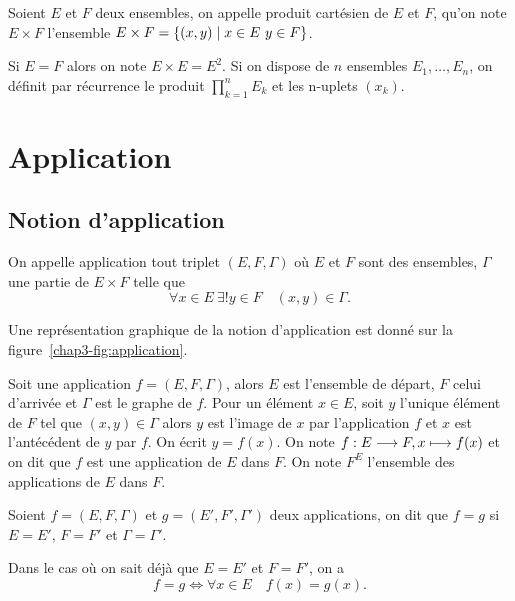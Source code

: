 \begin{defdef}
    Soient \(E\) et \(F\) deux ensembles, on appelle produit cartésien de \(E\) et 
    \(F\), qu'on note \(E \times F\) l'ensemble $E \times F = \left\{(x,y)\mathrel{}\middle|\mathrel{}x \in E 
    \ y \in F\right\}$.
\end{defdef}

Si \(E = F\) alors on note \(E \times E = E^2\). Si on dispose de \(n\) ensembles 
\(E_1, \ldots, E_n\), on définit par récurrence le produit \(\prod_{k = 1}^n E_k\) 
et les n-uplets \((x_k)\).

\section{Application}
\label{chap3-sec:applications}

\subsection{Notion d'application}
\label{chap3-subsec:notiondapplication}

\begin{defdef}
    On appelle application tout triplet \((E, F, \Gamma)\) où \(E\) et \(F\) sont 
    des ensembles, \(\Gamma\) une partie de \(E \times F\) telle que
    \begin{equation}
        \forall x \in E \ \exists! y \in F \quad (x,y) \in \Gamma.
    \end{equation}
\end{defdef}

Une représentation graphique de la notion d'application est donné sur la 
figure~\ref{chap3-fig:application}. 

Soit une application \(f = (E,F,\Gamma)\), alors \(E\) est l'ensemble de départ, 
\(F\) celui d'arrivée et \(\Gamma\) est le graphe de \(f\).
Pour un élément \(x \in E\), soit \(y\) l'unique élément de \(F\) tel que 
\((x,y) \in \Gamma\) alors \(y\) est l'image de \(x\) par l'application \(f\) et 
\(x\) est l'antécédent de \(y\) par \(f\). On écrit \(y = f(x)\). On note 
\(f:E \longrightarrow F, x \longmapsto f(x)\) et on dit que \(f\) est une application de 
\(E\) dans \(F\). On note \(F^E\) l'ensemble des applications de \(E\) dans 
\(F\).

\begin{defdef}
    Soient \(f = (E, F, \Gamma)\) et \(g = (E', F', \Gamma')\) deux applications, on 
    dit que \(f = g\) si \(E = E'\), \(F = F'\) et \(\Gamma = \Gamma'\).
\end{defdef}
Dans le cas où on sait déjà que \(E = E'\) et \(F = F'\), on a
\begin{equation}
    f = g \iff \forall x \in E \quad f(x) = g(x).
\end{equation}


